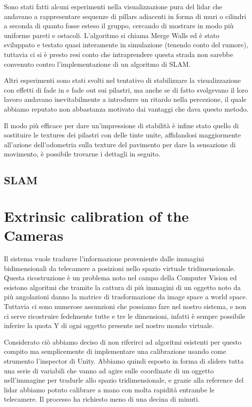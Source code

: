 \documentclass{Configuration_Files/PoliMi3i_thesis}
\begin{document}
Sono stati fatti alcuni esperimenti nella visualizzazione pura del lidar che andavano a rappresentare sequenze di pillars adiacenti in forma di muri o cilindri a seconda di quanto fosse esteso il gruppo, cercando di mostrare in modo più uniforme pareti e ostacoli. L’algoritmo si chiama Merge Walls ed è stato sviluppato e testato quasi interamente in simulazione (tenendo conto del rumore), tuttavia ci si è presto resi conto che intraprendere questa strada non sarebbe convenuto contro l’implementazione di un algoritmo di SLAM.

Altri esperimenti sono stati svolti nel tentativo di stabilizzare la visualizzazione con effetti di fade in e fade out sui pilastri, ma anche se di fatto svolgevano il loro lavoro andavano inevitabilmente a introdurre un ritardo nella percezione, il quale abbiamo reputato non abbastanza motivato dai vantaggi che dava questo metodo.

Il modo più efficace per dare un’impressione di stabilità è infine stato quello di sostituire le textures dei pilastri con delle tinte unite, affidandosi maggiormente all’azione dell’odometria sulla texture del pavimento per dare la sensazione di movimento, è possibile trovarne i dettagli in seguito.

\subsection{SLAM}

\section{Extrinsic calibration of the Cameras}

Il sistema vuole tradurre l’informazione proveniente dalle immagini bidimensionali da telecamere a posizioni nello spazio virtuale tridimensionale. Questa ricostruzione è un problema noto nel campo della Computer Vision ed esistono algoritmi che tramite la cattura di più immagini di un oggetto noto da più angolazioni danno la matrice di trasformazione da image space a world space. Tuttavia ci sono numerose assunzioni che possiamo fare nel nostro sistema, e non ci serve ricostruire fedelmente tutte e tre le dimensioni, infatti è sempre possibile inferire la quota Y di ogni oggetto presente nel nostro mondo virtuale.

Considerato ciò abbiamo deciso di non riferirci ad algoritmi esistenti per questo compito ma semplicemente di implementare una calibrazione usando come strumento l’inspector di Unity. Abbiamo quindi esposto in forma di sliders tutta una serie di variabili che vanno ad agire sulle coordinate di un oggetto nell’immagine per tradurle allo spazio tridimensionale, e grazie alla reference del lidar abbiamo potuto calibrare a mano con molta rapidità entrambe le telecamere. Il processo ha richiesto meno di una decina di minuti.
\end{document}
